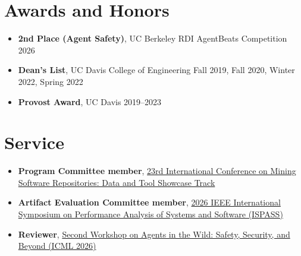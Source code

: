 \documentclass[letterpaper,10pt]{article}
\begin{document}
\section{Awards and Honors}
{\normalsize
\begin{itemize}[leftmargin=0.15in, label={}, itemsep=0pt]
  \item \textbf{2nd Place (Agent Safety)}, UC Berkeley RDI AgentBeats Competition \hfill 2026
  \item \textbf{Dean's List}, UC Davis College of Engineering \hfill Fall 2019, Fall 2020, Winter 2022, Spring 2022
  \item \textbf{Provost Award}, UC Davis \hfill 2019--2023
\end{itemize}
}

\section{Service}
{\normalsize
\begin{itemize}[leftmargin=0.15in, label=\textbullet, itemsep=0pt]
  \item \textbf{Program Committee member}, \href{https://2026.msrconf.org/track/msr-2026-data-and-tool-showcase-track}{23rd International Conference on Mining Software Repositories: Data and Tool Showcase Track}
  \item \textbf{Artifact Evaluation Committee member}, \href{https://ispass.org/ispass2026/}{2026 IEEE International Symposium on Performance Analysis of Systems and Software (ISPASS)}
  \item \textbf{Reviewer}, \href{https://agentwild-workshop.github.io/icml2026/}{Second Workshop on Agents in the Wild: Safety, Security, and Beyond (ICML 2026)}
\end{itemize}
}
\end{document}
